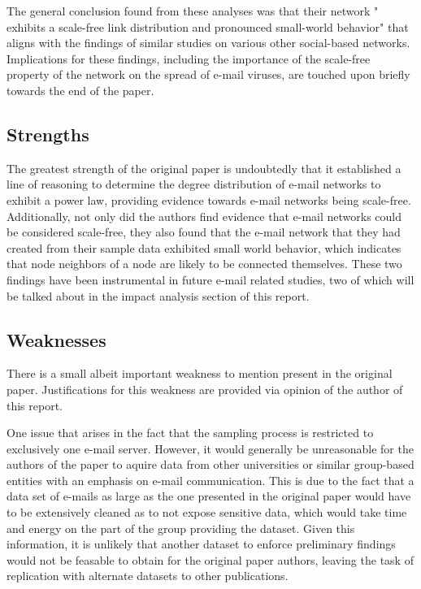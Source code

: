 \documentclass[a4paper]{article}
\begin{document}
\begin{multicols}{2}
The general conclusion found from these analyses was that their network " exhibits a scale-free link distribution and pronounced small-world behavior" \cite{1} that aligns with the findings of similar studies on various other social-based networks. Implications for these findings, including the importance of the scale-free property of the network on the spread of e-mail viruses, are touched upon briefly towards the end of the paper. 

\subsection{Strengths}
\hspace*{\parindent}The greatest strength of the original paper is undoubtedly that it established a line of reasoning to determine the degree distribution of e-mail networks to exhibit a power law, providing evidence towards e-mail networks being scale-free. Additionally, not only did the authors find evidence that e-mail networks could be considered scale-free, they also found that the e-mail network that they had created from their sample data exhibited small world behavior, which indicates that node neighbors of a node are likely to be connected themselves. These two findings have been instrumental in future e-mail related studies, two of which will be talked about in the impact analysis section of this report.

\subsection{Weaknesses}
\hspace*{\parindent}There is a small albeit important weakness to mention present in the original paper. Justifications for this weakness are provided via opinion of the author of this report.

One issue that arises in the fact that the sampling process is restricted to exclusively one e-mail server. However, it would generally be unreasonable for the authors of the paper to aquire data from other universities or similar group-based entities with an emphasis on e-mail communication. This is due to the fact that a data set of e-mails as large as the one presented in the original paper would have to be extensively cleaned as to not expose sensitive data, which would take time and energy on the part of the group providing the dataset. Given this information, it is unlikely that another dataset to enforce preliminary findings would not be feasable to obtain for the original paper authors, leaving the task of replication with alternate datasets to other publications.


\end{multicols}
\end{document}
